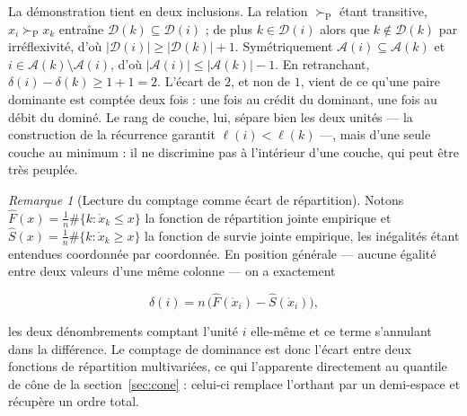 \documentclass[11pt,a4paper]{article}
\theoremstyle{definition}
\theoremstyle{remark}
\newtheorem{remarque}{Remarque}[section]
\newcommand{\abs}[1]{\left\lvert #1 \right\rvert}
\newcommand{\pareto}{\succ_{\mathrm{P}}}
\begin{document}
\bigskip

La démonstration tient en deux inclusions. La relation $\pareto$ étant transitive,
$x_i \pareto x_k$ entraîne $\mathcal{D}(k) \subseteq \mathcal{D}(i)$ ; de plus
$k \in \mathcal{D}(i)$ alors que $k \notin \mathcal{D}(k)$ par irréflexivité, d'où
$\abs{\mathcal{D}(i)} \ge \abs{\mathcal{D}(k)} + 1$. Symétriquement
$\mathcal{A}(i) \subseteq \mathcal{A}(k)$ et $i \in \mathcal{A}(k) \setminus
\mathcal{A}(i)$, d'où $\abs{\mathcal{A}(i)} \le \abs{\mathcal{A}(k)} - 1$. En retranchant,
$\delta(i) - \delta(k) \ge 1 + 1 = 2$. L'écart de $2$, et non de $1$, vient de ce qu'une
paire dominante est comptée deux fois : une fois au crédit du dominant, une fois au débit
du dominé. Le rang de couche, lui, sépare bien les deux unités --- la construction de la
récurrence garantit $\ell(i) < \ell(k)$ ---, mais d'une seule couche au minimum : il ne
discrimine pas à l'intérieur d'une couche, qui peut être très peuplée.

\bigskip

\begin{remarque}[Lecture du comptage comme écart de répartition]
  \label{rem:comptage-cdf}
  Notons $\hat{F}(x) = \frac{1}{n}\#\{k : \mathring{x}_k \le x\}$ la fonction de
  répartition jointe empirique et
  $\hat{S}(x) = \frac{1}{n}\#\{k : \mathring{x}_k \ge x\}$ la fonction de survie jointe
  empirique, les inégalités étant entendues coordonnée par coordonnée. En position
  générale --- aucune égalité entre deux valeurs d'une même colonne --- on a exactement

  \medskip

  \[
    \delta(i) = n\,\big(\hat{F}(\mathring{x}_i) - \hat{S}(\mathring{x}_i)\big),
  \]

  \bigskip

  les deux dénombrements comptant l'unité $i$ elle-même et ce terme s'annulant dans la
  différence. Le comptage de dominance est donc l'écart entre deux fonctions de
  répartition multivariées, ce qui l'apparente directement au quantile de cône de la
  section~\ref{sec:cone} : celui-ci remplace l'orthant par un demi-espace et récupère un
  ordre total.
\end{remarque}

\bigskip
\end{document}
